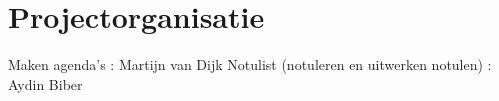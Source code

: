 \chapter{Projectorganisatie}
Maken agenda's : Martijn van Dijk
Notulist (notuleren en uitwerken notulen) : Aydin Biber